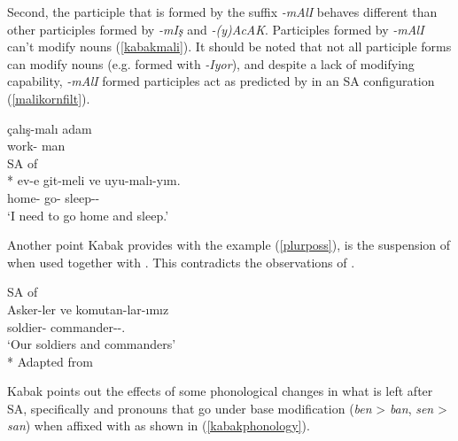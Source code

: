 Second, the participle that is formed by the suffix \textit{-mAlI} behaves different than other participles formed by \textit{-mIş} and \textit{-(y)AcAK}. Participles formed by \textit{-mAlI} can't modify nouns (\ref{kabakmali}). It should be noted that not all participle forms can modify nouns (e.g. formed with \textit{-Iyor}), and despite a lack of modifying capability, \textit{-mAlI} formed participles act as predicted by \citet{kornfilt1996some} in an SA configuration (\ref{malikornfilt}).

\begin{exe}
\ex \begin{xlist}
    \ex \label{kabakmali}
    \gll *çalış-malı adam \\ work-{\Nec} man \\
    
    \ex \label{malikornfilt} SA of {\Fsg}\\* 
    \gll ev-e git-meli ve uyu-malı-yım. \\ 
    home-{\Dat} go-{\Nec} {\And} sleep-{\Nec}-{\Fsg} \\
    \glt `I need to go home and sleep.'
\end{xlist}
\end{exe}

Another point Kabak provides with the example (\ref{plurposs}), is the suspension of {\Poss} when used together with {\Pl}. This contradicts the observations of \citet{orgun1995flat}.

\begin{exe}
    \ex \label{plurposs} SA of {\Poss} \\ 
    \gll Asker-ler ve komutan-lar-ımız \\ 
    soldier-{\Pl} {\And} commander-{\Pl}-{\Fpl}.{\Poss} \\
    \glt `Our soldiers and commanders'\\*
    \hfill Adapted from \citet{kabak2007turkish}
\end{exe}

Kabak points out the effects of some phonological changes in what is left after SA, specifically {\Fsg} and {\Ssg} pronouns that go under base modification (\textit{ben} {\textgreater} \textit{ban}, \textit{sen} {\textgreater} \textit{san}) when affixed with {\Dat} as shown in (\ref{kabakphonology}).

